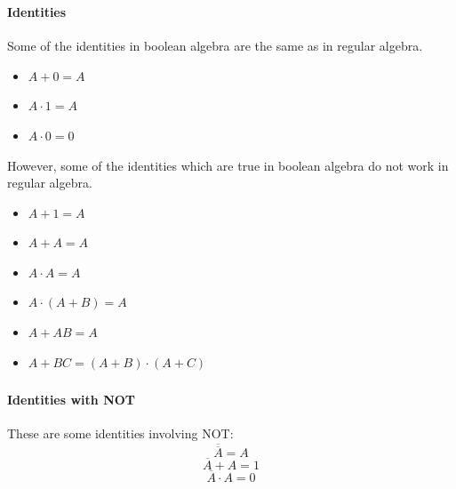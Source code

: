 \documentclass{beamer}
\newenvironment{namedframe}[1]%
	{\begin{frame}\frametitle{\secname}\framesubtitle{#1}}
	{\end{frame}}
\newcommand{\negate}[1]{\overline{#1}}
\begin{document}
	\begin{namedframe}{Identities}
		Some of the identities in boolean algebra are the same as in regular algebra.
		\begin{itemize}[<+(1)->]
			\item $A + 0 = A$
			\item $A \cdot 1 = A$
			\item $A \cdot 0 = 0$
		\end{itemize}
		\pause
		However, some of the identities which are true in boolean algebra do not work in regular algebra.
		\begin{center}
			\begin{minipage}{0.25\textwidth}
				\begin{itemize}[<+(1)->]
					\item $A + 1 = A$
					\item $A + A = A$
					\item $A \cdot A = A$
				\end{itemize}
			\end{minipage}
			\begin{minipage}{0.65\textwidth}
				\begin{itemize}[<+(1)->]
					\item $A \cdot (A + B) = A$
					\item $A + AB = A$
					\item $A + BC = (A + B) \cdot (A + C)$
				\end{itemize}
			\end{minipage}
		\end{center}
	\end{namedframe}
	\begin{namedframe}{Identities with NOT}
		These are some identities involving NOT:
		\pause
		\[\negate{\negate{A}} = A\]
		\pause
		\[\negate{A} + A = 1\]
		\pause
		\[\negate{A} \cdot A = 0\]
	\end{namedframe}
\end{document}

